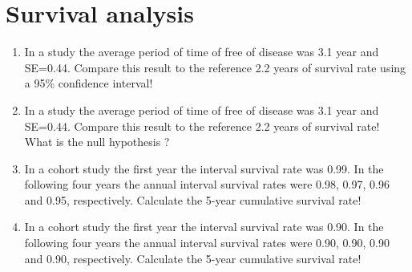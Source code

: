 \section{Survival analysis}
\begin{enumerate}
\item In a study the average period of time of free of disease was 3.1 year and SE=0.44. Compare this result to the reference 2.2 years of survival rate using a 95\% confidence interval!
\item In a study the average period of time of free of disease was 3.1 year and SE=0.44. Compare this result to the reference 2.2 years of survival rate! What is the null hypothesis ? 
\item In a cohort study the first year the interval survival rate was 0.99. In the following four years the annual interval survival rates were 0.98, 0.97, 0.96 and 0.95, respectively. Calculate the 5-year cumulative survival rate!
\item In a cohort study the first year the interval survival rate was 0.90. In the following four years the annual interval survival rates were 0.90, 0.90, 0.90 and 0.90, respectively. Calculate the 5-year cumulative survival rate!
\end{enumerate}
